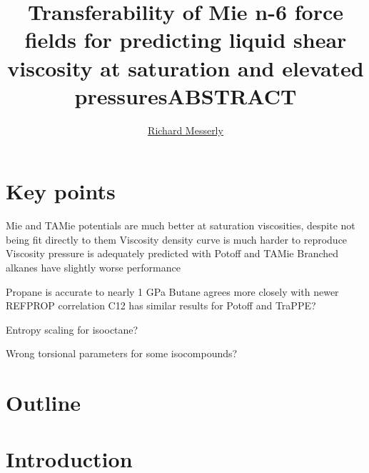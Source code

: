 \documentclass[11pt,a4paper]{article}
\begin{document}
	\thispagestyle{empty}
	\title{\Large \textbf{Transferability of Mie n-6 force fields for predicting liquid shear viscosity at saturation and elevated pressures}}
	\author[1]{\large {\underline{Richard Messerly}}}%
	
	
	\date{} %
	\maketitle\thispagestyle{empty} %
	\begin{center}
		\title{\textbf{ABSTRACT}}\centering{}
	\end{center}
	\justify
	
\section*{Key points}

Mie and TAMie potentials are much better at saturation viscosities, despite not being fit directly to them
Viscosity density curve is much harder to reproduce
Viscosity pressure is adequately predicted with Potoff and TAMie
Branched alkanes have slightly worse performance

Propane is accurate to nearly 1 GPa
Butane agrees more closely with newer REFPROP correlation
C12 has similar results for Potoff and TraPPE?

Entropy scaling for isooctane?

Wrong torsional parameters for some isocompounds?

\section*{Outline}

\section{Introduction}
\end{document}
